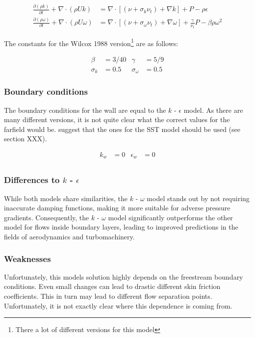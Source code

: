 \begin{align}
    \label{eq:transport_k_omega}
    \frac{\partial (\rho k)}{\partial t} + 
    \nabla \cdot (\rho U k) &=
    \nabla \cdot \left[ 
        \left( \nu + \sigma_k \nu_t \right) + \nabla k 
    \right] + P - \rho \epsilon \\
%
    \label{eq:tranport_epsilon_omega}
    \frac{\partial (\rho \omega)}{\partial t} + 
    \nabla \cdot (\rho U \omega) &=
    \nabla \cdot \left[ 
        \left( \nu + \sigma_{\omega} \nu_t \right) + \nabla  \omega
    \right] + \frac{\gamma}{\nu_t} P - \beta \rho \omega^2
\end{align}

\noindent The constants for the Wilcox 1988 version\footnote{There a lot of
different versions for this model} are as follows: \cite{nasatmr}

\begin{align*}
    \beta       &= 3/40     & \gamma            &= 5/9\\
    \sigma_k    &= 0.5      & \sigma_{\omega}   &= 0.5
\end{align*}


\subsubsection{Boundary conditions}
The boundary conditions for the wall are equal to the $k$ - $\epsilon$ model.
As there are many different versions, it is not quite clear what the correct
values for the farfield would be. \cite{nasatmr} suggest that the ones for the
SST model should be used (see section XXX). \cite{cfd101_k-omega}

\begin{align*}
    k_{w}        &= 0           &\epsilon_{w}       &= 0 \\
\end{align*}


\subsubsection{Differences to $k$ - $\epsilon$}
While both models share similarities, the $k$ - $\omega$ model stands out by
not requiring inaccurate damping functions, making it more suitable for adverse
pressure gradients. Consequently, the $k$ - $\omega$ model significantly
outperforms the other model for flows inside boundary layers, leading to
improved predictions in the fields of aerodynamics and turbomachinery.


\subsubsection{Weaknesses}
Unfortunately, this models solution highly depends on the freestream boundary
conditions. Even small changes can lead to drastic different skin friction
coefficients. This in turn may lead to different flow separation points.
Unfortunately, it is not exactly clear where this dependence is coming from.
\cite{cfd101_k-omega}




